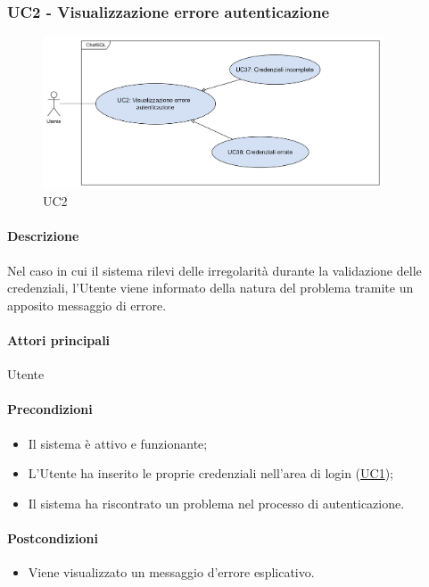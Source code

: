 \subsubsection{UC2 - Visualizzazione errore autenticazione}\label{UC2}

\begin{figure}[H]
  \centering
  \includegraphics[width=0.90\textwidth]{assets/uc2.png}
  \caption{UC2}
\end{figure}

\paragraph*{Descrizione}
Nel caso in cui il sistema rilevi delle irregolarità durante la validazione delle credenziali, l'Utente viene informato della natura del problema tramite un apposito messaggio di errore.

\paragraph*{Attori principali}
Utente

\paragraph*{Precondizioni}
\begin{itemize}
  \item Il sistema è attivo e funzionante;
  \item L'Utente ha inserito le proprie credenziali nell'area di login (\hyperref[UC1]{UC1});
  \item Il sistema ha riscontrato un problema nel processo di autenticazione.  
\end{itemize}

\paragraph*{Postcondizioni}
\begin{itemize}
  \item Viene visualizzato un messaggio d'errore esplicativo.
\end{itemize}

